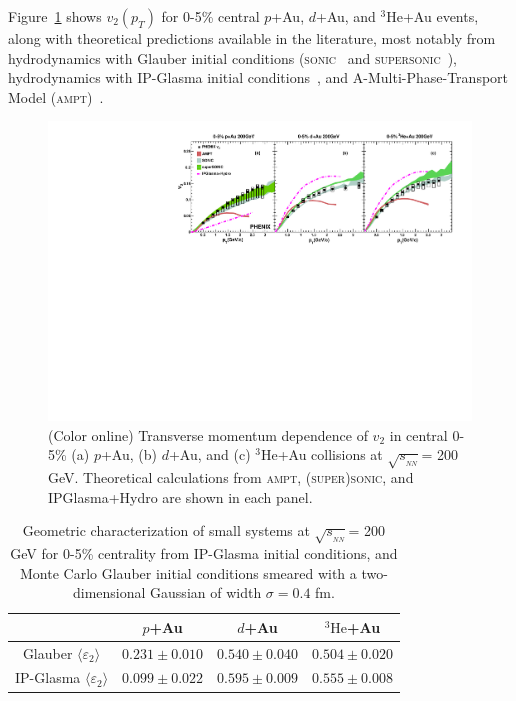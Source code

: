 \documentclass[%
reprint,
showpacs,preprintnumbers,
 amsmath,amssymb,
 aps,
]{revtex4-1}
\newcommand{\pt}{\mbox{$p_T$}\xspace}
\newcommand{\sqsn}{\mbox{$\sqrt{s_{_{NN}}}$}\xspace}
\newcommand{\dau}{\mbox{$d$+Au}\xspace}
\newcommand{\pau}{\mbox{$p$+Au}\xspace}
\newcommand{\hau}{\mbox{$^3\text{He}$+Au}\xspace}
\begin{document}
Figure~\ref{fig:figure5} shows $v_2(\pt)$ for 0-5\% central \pau, \dau, and \hau events, along with theoretical predictions available in the literature, most notably from hydrodynamics with Glauber initial conditions (\textsc{sonic}~\cite{Habich:2014jna} and \textsc{supersonic}~\cite{Romatschke:2015gxa}), hydrodynamics with IP-Glasma initial conditions~\cite{Schenke:2014gaa}, and A-Multi-Phase-Transport Model (\textsc{ampt})~\cite{lin_multiphase_2005}.

\begin{figure}[htbp]
  \includegraphics[scale=0.9]{Figures/figure5.pdf}
  \caption{(Color online) Transverse momentum dependence of $v_2$ in central 0-5\% (a) \pau, (b) \dau, and (c) \hau collisions at \sqsn = 200 GeV. Theoretical calculations from \textsc{ampt}, \textsc{(super)sonic}, and IPGlasma+Hydro are shown in each panel.}
\label{fig:figure5}
\end{figure}

\begin{table}
\caption{Geometric characterization of small systems at \sqsn = 200 GeV for 0-5\% centrality from IP-Glasma initial conditions, and Monte Carlo Glauber initial conditions smeared with a two-dimensional Gaussian of width $\sigma=0.4$ fm.}
\begin{ruledtabular}
\begin{tabular}{c c c c}
\label{table_geometry_glasma}
 & \pau & \dau & \hau \\ \hline
 Glauber $\langle \varepsilon_2 \rangle$ & $0.231\pm 0.010$ & $0.540\pm 0.040$ & $0.504\pm 0.020$ \\
 IP-Glasma $\langle \varepsilon_2 \rangle$ & $0.099\pm 0.022$ & $0.595\pm 0.009$ & $0.555\pm 0.008$ \\
\end{tabular}
\end{ruledtabular}
\end{table}
\end{document}
